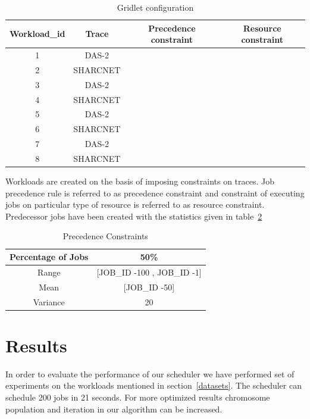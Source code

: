 \begin{table}[ht]
\caption{Gridlet configuration}
\centering
    \begin{tabular}{|c|c|c|c|}
    \hline \hline
    Workload\_id & Trace        & Precedence constraint & Resource constraint \\ \hline
    1 	         & DAS-2    & \xmark                 & \xmark   \\
    2 	         & SHARCNET & \xmark                 & \xmark   \\
    3 	         & DAS-2    & \xmark                 & \cmark   \\
    4 	         & SHARCNET & \xmark                 & \cmark   \\
    5	         & DAS-2    & \cmark                 & \xmark   \\
    6	         & SHARCNET & \cmark                 & \xmark   \\
    7	         & DAS-2    & \cmark                 & \cmark   \\
    8 	         & SHARCNET & \cmark                 & \cmark   \\ \hline \hline
    \end{tabular}
\label{tab:gridlet}
\end{table}
\begin{framed}
 Workloads are created on the basis of imposing constraints on traces. Job precedence rule is referred to as precedence constraint and constraint of executing jobs on particular type of resource is referred to as resource constraint. Predecessor jobs have been created with the statistics given in table~\ref{pcons}
\end{framed}
\begin{table}[h]
\caption{Precedence Constraints}
\centering
    \begin{tabular}{|c|c|}
    \hline \hline
    Percentage of Jobs & 50\%  \\ \hline \hline
    Range & [JOB\_ID -100 , JOB\_ID -1] \\ \hline
    Mean  & [JOB\_ID -50] \\ \hline
    Variance & 20 \\ \hline \hline
    \end{tabular}
\label{pcons}
\end{table}

\section{Results}
In order to evaluate the performance of our scheduler we have performed set of experiments on the workloads mentioned in section~\ref{datasets}. The scheduler can schedule 200 jobs in 21 seconds. For more optimized results chromosome population and iteration in our algorithm can be increased. 
